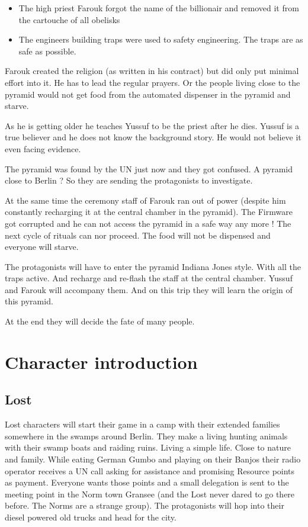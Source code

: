 \begin{itemize}
    \item The high priest Farouk forgot the name of the billionair and removed it from the cartouche of all obelisks
    \item The engineers building traps were used to safety engineering. The traps are as safe as possible.
\end{itemize}

Farouk created the religion (as written in his contract) but did only put minimal effort into it. He has to lead the regular prayers. Or the people living close to the pyramid would not get food from the automated dispenser in the pyramid and starve.

As he is getting older he teaches Yussuf to be the priest after he dies. Yussuf is a true believer and he does not know the background story. He would not believe it even facing evidence.

The pyramid was found by the UN just now and they got confused. A pyramid close to Berlin ? So they are sending the protagonists to investigate.

At the same time the ceremony staff of Farouk ran out of power (despite him constantly recharging it at the central chamber in the pyramid). The Firmware got corrupted and he can not access the pyramid in a safe way any more ! The next cycle of rituals can nor proceed. The food will not be dispensed and everyone will starve.

The protagonists will have to enter the pyramid Indiana Jones style. With all the traps active. And recharge and re-flash the staff at the central chamber. Yussuf and Farouk will accompany them. And on this trip they will learn the origin of this pyramid.

At the end they will decide the fate of many people.

\section{Character introduction}

\subsection{Lost}

Lost characters will start their game in a camp with their extended families somewhere in the swamps around Berlin. They make a living hunting animals with their swamp boats and raiding ruins. Living a simple life. Close to nature and family. While eating German Gumbo and playing on their Banjos their radio operator receives a UN call asking for assistance and promising Resource points as payment. Everyone wants those points and a small delegation is sent to the meeting point in the Norm town Gransee (and the Lost never dared to go there before. The Norms are a strange group).
The protagonists will hop into their diesel powered old trucks and head for the city.

